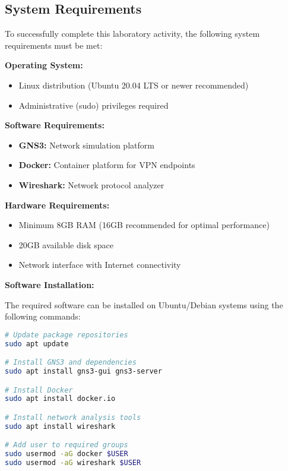 \subsection{System Requirements}

To successfully complete this laboratory activity, the following system requirements must be met:

\begin{tcolorbox}[colback=blue!5!white,colframe=blue!75!black,title=System Requirements]
\textbf{Operating System:}
\begin{itemize}
    \item Linux distribution (Ubuntu 20.04 LTS or newer recommended)
    \item Administrative (sudo) privileges required
\end{itemize}

\textbf{Software Requirements:}
\begin{itemize}
    \item \textbf{GNS3:} Network simulation platform
    \item \textbf{Docker:} Container platform for VPN endpoints
    \item \textbf{Wireshark:} Network protocol analyzer
\end{itemize}

\textbf{Hardware Requirements:}
\begin{itemize}
    \item Minimum 8GB RAM (16GB recommended for optimal performance)
    \item 20GB available disk space
    \item Network interface with Internet connectivity
\end{itemize}
\end{tcolorbox}

\textbf{Software Installation:}

The required software can be installed on Ubuntu/Debian systems using the following commands:

\begin{lstlisting}[language=bash]
# Update package repositories
sudo apt update

# Install GNS3 and dependencies
sudo apt install gns3-gui gns3-server

# Install Docker
sudo apt install docker.io

# Install network analysis tools
sudo apt install wireshark

# Add user to required groups
sudo usermod -aG docker $USER
sudo usermod -aG wireshark $USER
\end{lstlisting}

